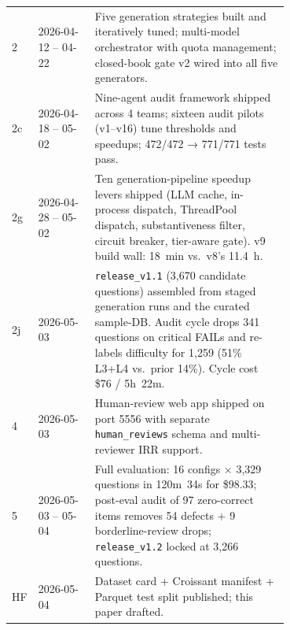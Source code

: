 \begin{table}[h]
\begin{tabular}{llp{0.7\linewidth}}
    2   & 2026-04-12 -- 04-22 & Five generation strategies built and iteratively
                               tuned; multi-model orchestrator with quota management;
                               closed-book gate v2 wired into all five generators. \\
    2c  & 2026-04-18 -- 05-02 & Nine-agent audit framework shipped across 4 teams;
                               sixteen audit pilots (v1--v16) tune thresholds and
                               speedups; 472/472 → 771/771 tests pass. \\
    2g  & 2026-04-28 -- 05-02 & Ten generation-pipeline speedup levers shipped
                               (LLM cache, in-process dispatch, ThreadPool dispatch,
                               substantiveness filter, circuit breaker, tier-aware
                               gate). v9 build wall: 18~min vs.\ v8's 11.4~h. \\
    2j  & 2026-05-03         & \texttt{release\_v1.1} (3{,}670 candidate questions)
                               assembled from staged generation runs and the curated
                               sample-DB. Audit cycle drops 341 questions on critical
                               FAILs and re-labels difficulty for 1{,}259 (51\%
                               L3+L4 vs.\ prior 14\%). Cycle cost \$76 / 5h~22m. \\
    4   & 2026-05-03         & Human-review web app shipped on port 5556 with
                               separate \texttt{human\_reviews} schema and
                               multi-reviewer IRR support. \\
    5   & 2026-05-03 -- 05-04 & Full evaluation: 16 configs $\times$ 3{,}329 questions
                               in 120m~34s for \$98.33; post-eval audit of 97
                               zero-correct items removes 54 defects + 9
                               borderline-review drops; \texttt{release\_v1.2}
                               locked at 3{,}266 questions. \\
    HF  & 2026-05-04         & Dataset card + Croissant manifest + Parquet test
                               split published; this paper drafted. \\
    \bottomrule
  \end{tabular}
\end{table}
